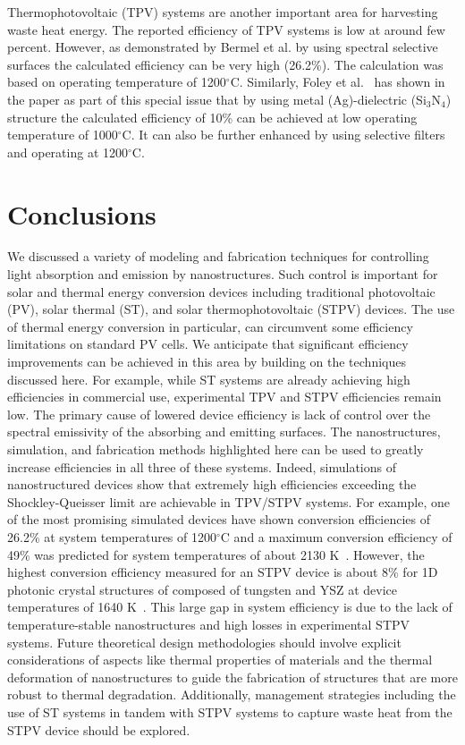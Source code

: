 \documentclass[10pt,letterpaper]{article}
\begin{document}
Thermophotovoltaic (TPV) systems are another important area for harvesting waste heat energy. The reported efficiency of TPV systems is low at around few percent. However, as demonstrated by Bermel et al. \cite{g4} by using spectral selective surfaces the calculated efficiency can be  very high (26.2\%). The calculation was based on operating temperature of 1200$^\circ$C. Similarly, Foley et al.~\cite{FUS_OptExp_2015} has shown in the paper as part of this special issue that by using metal (Ag)-dielectric (Si$_3$N$_4$) structure the calculated  efficiency of 10\% can be achieved at low operating temperature of 1000$^{\circ}$C.  It can also be further enhanced by using selective filters and operating at 1200$^\circ$C. 

\section{Conclusions}
We discussed a variety of modeling and fabrication techniques for controlling light 
absorption and emission by nanostructures.   Such control is important for solar and 
thermal energy conversion devices including traditional photovoltaic (PV), 
solar thermal (ST), and solar thermophotovoltaic (STPV) devices. 
The use of thermal energy conversion in particular, 
can circumvent some efficiency limitations on standard PV cells.  We 
anticipate that significant efficiency improvements can be achieved in this area 
by building on the techniques discussed here.  For example, while ST systems 
are already achieving high efficiencies in commercial use, experimental 
TPV and STPV efficiencies remain low.  The primary cause of lowered device 
efficiency is lack of control over the spectral emissivity of the 
absorbing and emitting surfaces.  The nanostructures, simulation, and 
fabrication methods highlighted here can be used to greatly increase 
efficiencies in all three of these systems.  
Indeed, simulations of nanostructured devices show that extremely high efficiencies 
exceeding the Shockley-Queisser limit are achievable in TPV/STPV systems.
For example, one of the most promising simulated devices have shown conversion efficiencies of 26.2\% at 
system temperatures of 1200$^\circ$C and a maximum conversion efficiency of 49\% was predicted for system 
temperatures of about 2130 K~\cite{RF_OptExp_2009}.  However, the highest conversion efficiency measured
for an STPV device is about 8\% for 1D photonic crystal structures of composed of tungsten and YSZ at 
device temperatures of 1640 K~\cite{SKY_JPE_2015}.  This large gap in system efficiency is due to the lack of temperature-stable 
nanostructures and high losses in experimental STPV systems.  Future theoretical design methodologies should involve
explicit considerations of aspects like thermal properties of materials and the thermal deformation of 
nanostructures to guide the fabrication of structures that are more robust to thermal degradation.    
Additionally, management strategies including the use of ST systems in tandem with STPV systems to capture waste heat from the STPV device
should be explored.
\end{document}

